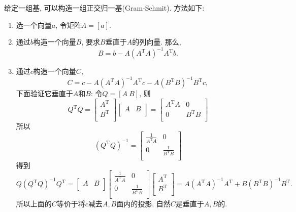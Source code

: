 给定一组基, 可以构造一组正交归一基(Gram-Schmit).
方法如下:
\begin{enumerate}
    \item 选一个向量$a$, 令矩阵$A = [a]$.
    
    \item 通过$b$构造一个向量$B$, 要求$B$垂直于$A$的列向量.
    那么,
    \begin{equation}
      B  = b - A \left( A^{\mathrm{T}}A \right) ^{-1} A^{\mathrm{T}} b.
    \end{equation}

    \item 通过$c$构造一个向量$C$,
    \begin{equation}
      C = c - A\left( A^{\mathrm{T}}A \right) ^{-1}A^{\mathrm{T}} c - A\left( B^{\mathrm{T}}B \right) ^{-1}B^{\mathrm{T}} c,
    \end{equation}
    下面验证它垂直于$A$和$B$:
    令$Q = [A\ B]$, 则
    \begin{equation}
      Q^{\mathrm{T}}Q  =\begin{bmatrix}
       A^{\mathrm{T}}\\
       B^{\mathrm{T}}\\
      \end{bmatrix}
      \begin{bmatrix}
       A & B\\
      \end{bmatrix}
      = \begin{bmatrix}
       A^{\mathrm{T}}A & 0\\
       0 & B^{\mathrm{T}}B\\
      \end{bmatrix}
    \end{equation}
    所以
    \begin{equation}
      \left( Q^{\mathrm{T}}Q \right) ^{-1} = \begin{bmatrix}
       \frac{1}{A^{\mathrm{T}}A} & 0\\
       0 & \frac{1}{B^{\mathrm{T}}B}\\
      \end{bmatrix}
    \end{equation}
    得到
    \begin{equation}
      Q\left( Q^{\mathrm{T}}Q \right) ^{-1}Q^{\mathrm{T}} =
      \begin{bmatrix}
       A & B\\
      \end{bmatrix}
      \begin{bmatrix}
       \frac{1}{A^{\mathrm{T}}A} & 0\\
       0 & \frac{1}{B^{\mathrm{T}}B}\\
      \end{bmatrix}
      \begin{bmatrix}
       A^{\mathrm{T}}\\
       B^{\mathrm{T}}\\
      \end{bmatrix}
      =
      A\left( A^{\mathrm{T}}A \right) ^{-1} A^{\mathrm{T}} + B \left( B^{\mathrm{T}}B \right) ^{-1} B^{\mathrm{T}}.
    \end{equation}
    所以上面的$C$等价于将$c$减去$A,B$面内的投影, 自然$C$是垂直于$A,B$的.


\end{enumerate}
